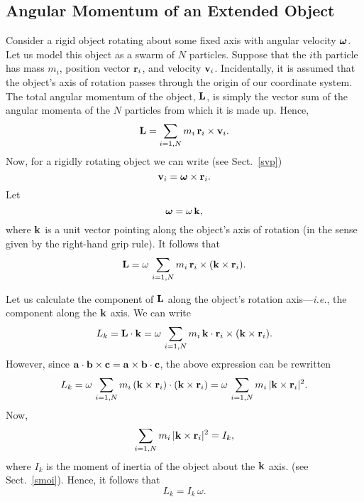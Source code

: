 \subsection{Angular Momentum of an Extended Object}
Consider a rigid object rotating about some fixed axis with angular velocity $\mbox{\boldmath$\omega$}$.
Let us model this object as a swarm of $N$ particles. Suppose that the $i$th particle
has mass $m_i$, position vector ${\bf r}_i$, and velocity ${\bf v}_i$. 
Incidentally, it is
assumed that the object's axis of rotation passes through the origin of our
coordinate system. The total angular momentum of the object, ${\bf L}$, is simply the
vector sum of the angular momenta of the $N$ particles from which it is made up. Hence,
\begin{equation}
{\bf L} = \sum_{i=1,N} m_i\,{\bf r}_i\times {\bf v}_i.
\end{equation}
Now, for a rigidly rotating object we can write (see Sect.~\ref{svp})
\begin{equation}
{\bf v}_i = \mbox{\boldmath$\omega$}\times {\bf r}_i.
\end{equation}
Let 
\begin{equation}
\mbox{\boldmath$\omega$} = \omega\,{\bf k},
\end{equation}
where ${\bf k}$ is a unit vector pointing along the object's axis of rotation (in the sense
given by the right-hand grip rule).
It follows that
\begin{equation}
{\bf L} = \omega \,\sum_{i=1,N} m_i\,{\bf r}_i\times ({\bf k}\times {\bf r}_i).
\end{equation}

Let us calculate the component of ${\bf L}$ along the object's rotation axis---{\em i.e.},
the component along the ${\bf k}$ axis. We can write
\begin{equation}
L_k = {\bf L}\cdot {\bf k} = \omega \,\sum_{i=1,N} m_i\,
{\bf k}\cdot {\bf r}_i\times ({\bf k}\times {\bf r}_i).
\end{equation}
However, since ${\bf a}\cdot {\bf b}\times {\bf c} = {\bf a}\times {\bf b} \cdot {\bf c}$,
the above expression can be rewritten
\begin{equation}
L_k  = \omega \,\sum_{i=1,N} m_i\,
({\bf k}\times {\bf r}_i)\cdot({\bf k}\times {\bf r}_i)= \omega \,\sum_{i=1,N} m_i\,
|{\bf k}\times {\bf r}_i|^2.
\end{equation}
Now,
\begin{equation}
\sum_{i=1,N} m_i\,
|{\bf k}\times {\bf r}_i|^2 = I_k,
\end{equation}
where $I_k$ is the moment of inertia of the object about the ${\bf k}$ axis.
(see Sect.~\ref{smoi}). Hence, it follows that
\begin{equation}
L_k = I_k\,\omega.
\end{equation}

